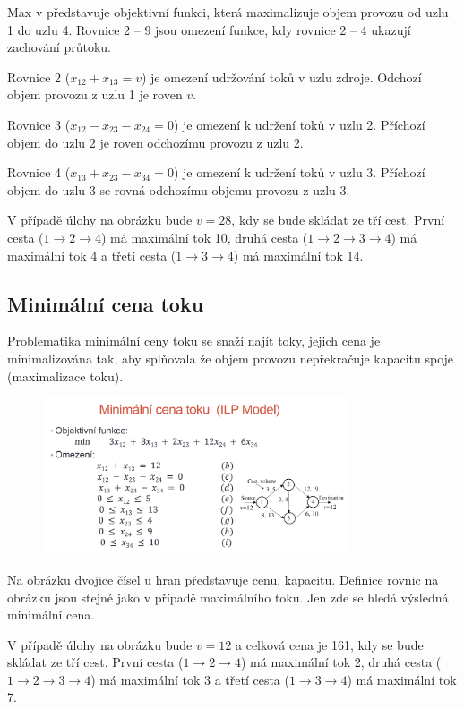 Max v představuje objektivní funkci, která maximalizuje objem provozu od uzlu 1 do uzlu 4. Rovnice 2 -- 9 jsou omezení funkce, kdy rovnice 2 -- 4 ukazují zachování průtoku.

Rovnice 2 ($x_{12} + x_{13} = v$) je omezení udržování toků v uzlu zdroje. Odchozí objem provozu z uzlu 1 je roven $v$.

Rovnice 3 ($x_{12} - x_{23} - x_{24} = 0$) je omezení k udržení toků v uzlu 2. Příchozí objem do uzlu 2 je roven odchozímu provozu z uzlu 2.

Rovnice 4 ($x_{13} + x_{23} - x_{34} = 0$) je omezení k udržení toků v uzlu 3. Příchozí objem do uzlu 3 se rovná odchozímu objemu provozu z uzlu 3.

V případě úlohy na obrázku bude $v = 28$, kdy se bude skládat ze tří cest. První cesta ($1\xrightarrow{}2\xrightarrow{}4$) má maximální tok 10, druhá cesta ($1\xrightarrow{}2\xrightarrow{}3\xrightarrow{}4$) má maximální tok 4 a třetí cesta ($1\xrightarrow{}3\xrightarrow{}4$) má maximální tok 14.

\subsection{Minimální cena toku}

Problematika minimální ceny toku se snaží najít toky, jejich cena je minimalizována tak, aby splňovala že objem provozu nepřekračuje kapacitu spoje (maximalizace toku).

\begin{figure} [h]
    \centering
    \includegraphics[width=0.8\textwidth]{snimky/MinCena.png}
\end{figure}

Na obrázku dvojice čísel u hran představuje cenu, kapacitu. Definice rovnic na obrázku jsou stejné jako v případě maximálního toku. Jen zde se hledá výsledná minimální cena.

V případě úlohy na obrázku bude $v = 12$ a celková cena je 161, kdy se bude skládat ze tří cest. První cesta ($1\xrightarrow{}2\xrightarrow{}4$) má maximální tok 2, druhá cesta ($1\xrightarrow{}2\xrightarrow{}3\xrightarrow{}4$) má maximální tok 3 a třetí cesta ($1\xrightarrow{}3\xrightarrow{}4$) má maximální tok 7.



